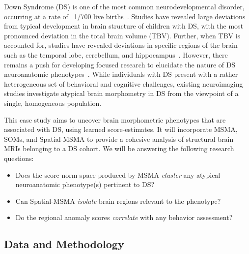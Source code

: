 Down Syndrome (DS) is one of the most common neurodevelopmental disorder, occurring at a rate of ~1/700 live births~\cite{parker2010updated}. Studies have revealed large deviations from typical development in brain structure of children with DS, with the most pronounced deviation in the total brain volume (TBV). Further, when TBV is accounted for, studies have revealed deviations in specific regions of the brain such as the temporal lobe, cerebellum, and hippocampus~\cite{hamnerPediatricBrainDevelopment2018}. However, there remains a push for developing focused research to elucidate the nature of DS neuroanatomic phenotypes~\cite{hamnerPediatricBrainDevelopment2018}. While individuals with DS present with a rather heterogeneous set of behavioral and cognitive challenges, existing neuroimaging studies investigate atypical brain morphometry in DS from the viewpoint of a single, homogeneous population.

This case study aims to uncover brain morphometric phenotypes that are associated with DS, using learned score-estimates. It will incorporate MSMA, SOMs, and Spatial-MSMA to provide a cohesive analysis of structural brain MRIs belonging to a DS cohort. We will be answering the following research questions:

\begin{itemize}
    \item Does the score-norm space produced by MSMA \textit{cluster} any atypical neuroanatomic phenotype(s) pertinent to DS?
    
    \item Can Spatial-MSMA \textit{isolate} brain regions relevant to the phenotype?
    
    \item Do the regional anomaly scores \textit{correlate} with any behavior assessment?
\end{itemize}





\subsection*{Data and Methodology}
 
